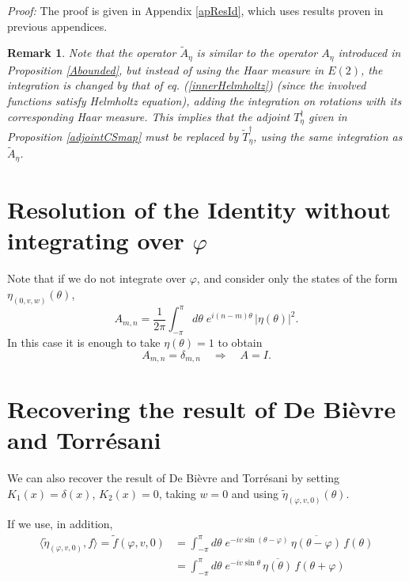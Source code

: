 \documentclass[11pt]{article}
\newtheorem{remark}[definition]{Remark}
\newcommand{\conj}[1]{\overline{#1}}
\begin{document}
\noindent\textit{Proof:} The proof is given in Appendix \ref{apResId}, which uses results proven in previous appendices.




\begin{remark}
 Note that the operator $\tilde{A}_{\eta}$ is similar to the operator $A_{\eta}$ introduced in Proposition \ref{Abounded}, but instead of using the Haar measure in $E(2)$, the integration is changed by that of eq. (\ref{innerHelmholtz}) (since the involved functions  satisfy Helmholtz equation), adding the integration on rotations with its corresponding Haar measure. This implies that the adjoint $T_\eta^{\dag}$ given in Proposition \ref{adjointCSmap} must be replaced by $\tilde{T}_\eta^{\dag}$, using the same integration as $\tilde{A}_{\eta}$.
 
\end{remark}


 


\section{Resolution of the Identity without integrating over $\varphi$}

Note that if we do not integrate over $\varphi$, and consider only the states
of the form $\eta_{(0,v,w)}(\theta)$,
\[
  A_{m,n}=\frac{1}{2\pi}\int_{-\pi}^{\pi}d\theta\;e^{i(n-m)\theta}\,|\eta(\theta)|^2.
\]
In this case it is enough to take $\eta(\theta)=1$ to obtain
\[
  A_{m,n}=\delta_{m,n}\quad\Rightarrow\quad A=I.
\]

\section{Recovering the result of De Bi\`evre and Torr\'esani}

We can also recover the result of De Bi\`evre and Torr\'esani by setting
$K_1(x)=\delta(x)$, $K_2(x)=0$, taking $w=0$ and using
$\tilde\eta_{(\varphi,v,0)}(\theta)$.

If we use, in addition,
\begin{align*}
  \langle\tilde\eta_{(\varphi,v,0)},f\rangle=\tilde f(\varphi,v,0)
  &=\int_{-\pi}^{\pi}d\theta\;e^{-iv\sin(\theta-\varphi)}\,
    \conj{\eta(\theta-\varphi)}\,f(\theta)\\
  &=\int_{-\pi}^{\pi}d\theta\;e^{-iv\sin\theta}\,\conj{\eta(\theta)}\,f(\theta+\varphi)
\end{align*}
\end{document}
